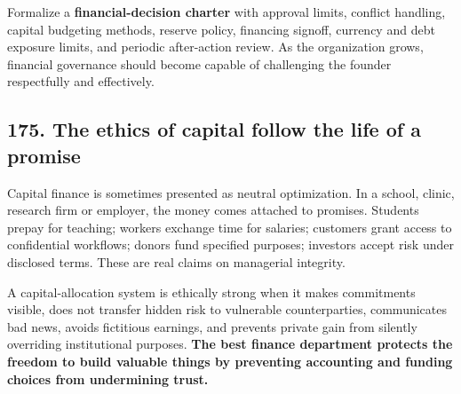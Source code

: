 Formalize a \textbf{financial-decision charter} with approval limits, conflict handling, capital budgeting methods, reserve policy, financing signoff, currency and debt exposure limits, and periodic after-action review. As the organization grows, financial governance should become capable of challenging the founder respectfully and effectively.

\subsection{175. The ethics of capital follow the life of a promise}


Capital finance is sometimes presented as neutral optimization. In a school, clinic, research firm or employer, the money comes attached to promises. Students prepay for teaching; workers exchange time for salaries; customers grant access to confidential workflows; donors fund specified purposes; investors accept risk under disclosed terms. These are real claims on managerial integrity.

A capital-allocation system is ethically strong when it makes commitments visible, does not transfer hidden risk to vulnerable counterparties, communicates bad news, avoids fictitious earnings, and prevents private gain from silently overriding institutional purposes. \textbf{The best finance department protects the freedom to build valuable things by preventing accounting and funding choices from undermining trust.}

